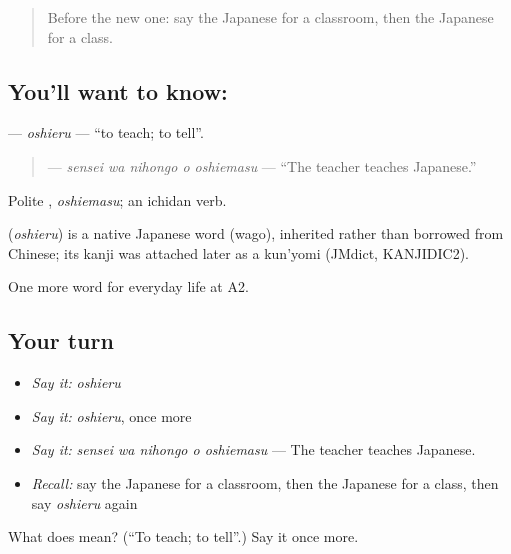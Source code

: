 \begin{quote}
Before the new one: say the Japanese for a classroom, then the Japanese for a class.
\end{quote}

\subsection*{You'll want to know: }
\textbf{} — \emph{oshieru} — \textquotedblleft{}to teach; to tell\textquotedblright{}.

\begin{quote}
\textbf{  } — \emph{sensei wa nihongo o oshiemasu} — \textquotedblleft{}The teacher teaches Japanese.\textquotedblright{}
\end{quote}

Polite \textbf{}, \emph{oshiemasu}; an ichidan verb.

\begin{cousinweb}
\textbf{} (\emph{oshieru}) is a native Japanese word (wago), inherited rather than borrowed from Chinese; its kanji was attached later as a kun'yomi (JMdict, KANJIDIC2).
\end{cousinweb}

\begin{grammarlens}[title={What you've built}]
One more word for everyday life at A2.
\end{grammarlens}

\subsection*{Your turn}
\begin{itemize}
\raggedright
  \item \emph{Say it:} \emph{oshieru}
  \item \emph{Say it:} \emph{oshieru}, once more
  \item \emph{Say it:} \emph{sensei wa nihongo o oshiemasu} — The teacher teaches Japanese.
  \item \emph{Recall:} say the Japanese for a classroom, then the Japanese for a class, then say \emph{oshieru} again
\end{itemize}

\begin{tcolorbox}[breakable,colback=teal!4,colframe=teal!35!black,title={Before you move on}]
What does  mean? (\textquotedblleft{}To teach; to tell\textquotedblright{}.) Say it once more.
\end{tcolorbox}
